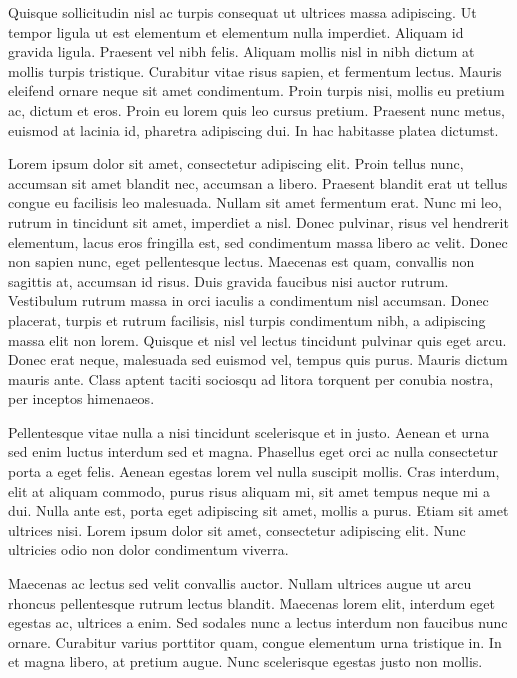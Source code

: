 Quisque sollicitudin nisl ac turpis consequat ut ultrices massa adipiscing. Ut tempor ligula ut est elementum et elementum nulla imperdiet. Aliquam id gravida ligula. Praesent vel nibh felis. Aliquam mollis nisl in nibh dictum at mollis turpis tristique. Curabitur vitae risus sapien, et fermentum lectus. Mauris eleifend ornare neque sit amet condimentum. Proin turpis nisi, mollis eu pretium ac, dictum et eros. Proin eu lorem quis leo cursus pretium. Praesent nunc metus, euismod at lacinia id, pharetra adipiscing dui. In hac habitasse platea dictumst.

Lorem ipsum dolor sit amet, consectetur adipiscing elit. Proin tellus nunc, accumsan sit amet blandit nec, accumsan a libero. Praesent blandit erat ut tellus congue eu facilisis leo malesuada. Nullam sit amet fermentum erat. Nunc mi leo, rutrum in tincidunt sit amet, imperdiet a nisl. Donec pulvinar, risus vel hendrerit elementum, lacus eros fringilla est, sed condimentum massa libero ac velit. Donec non sapien nunc, eget pellentesque lectus. Maecenas est quam, convallis non sagittis at, accumsan id risus. Duis gravida faucibus nisi auctor rutrum. Vestibulum rutrum massa in orci iaculis a condimentum nisl accumsan. Donec placerat, turpis et rutrum facilisis, nisl turpis condimentum nibh, a adipiscing massa elit non lorem. Quisque et nisl vel lectus tincidunt pulvinar quis eget arcu. Donec erat neque, malesuada sed euismod vel, tempus quis purus. Mauris dictum mauris ante. Class aptent taciti sociosqu ad litora torquent per conubia nostra, per inceptos himenaeos.

Pellentesque vitae nulla a nisi tincidunt scelerisque et in justo. Aenean et urna sed enim luctus interdum sed et magna. Phasellus eget orci ac nulla consectetur porta a eget felis. Aenean egestas lorem vel nulla suscipit mollis. Cras interdum, elit at aliquam commodo, purus risus aliquam mi, sit amet tempus neque mi a dui. Nulla ante est, porta eget adipiscing sit amet, mollis a purus. Etiam sit amet ultrices nisi. Lorem ipsum dolor sit amet, consectetur adipiscing elit. Nunc ultricies odio non dolor condimentum viverra.

Maecenas ac lectus sed velit convallis auctor. Nullam ultrices augue ut arcu rhoncus pellentesque rutrum lectus blandit. Maecenas lorem elit, interdum eget egestas ac, ultrices a enim. Sed sodales nunc a lectus interdum non faucibus nunc ornare. Curabitur varius porttitor quam, congue elementum urna tristique in. In et magna libero, at pretium augue. Nunc scelerisque egestas justo non mollis.

